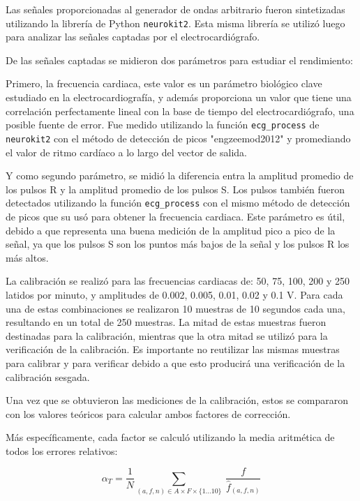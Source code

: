\documentclass[conference]{IEEEtran}
\begin{document}
Las señales proporcionadas al generador de ondas arbitrario fueron sintetizadas 
utilizando la librería de Python \texttt{neurokit2}. \cite{neurokit2}
Esta misma librería se utilizó
luego para analizar las señales captadas por el electrocardiógrafo.

De las señales captadas se midieron dos parámetros para estudiar el rendimiento:

Primero, la frecuencia cardiaca, este valor es un parámetro biológico clave estudiado
en la electrocardiografía, y además proporciona un valor que tiene una correlación
perfectamente lineal con la base de tiempo del electrocardiógrafo, una posible fuente
de error. Fue medido utilizando la función \texttt{ecg\_process} de \texttt{neurokit2}
con  el método de detección de picos "engzeemod2012" y promediando el valor de ritmo
cardíaco a lo largo del vector de salida.

Y como segundo parámetro, se midió la diferencia entra la amplitud promedio de los
pulsos R y la amplitud promedio de los pulsos S. Los pulsos también fueron detectados
utilizando la función \texttt{ecg\_process} con el mismo método de detección de picos
que su usó para obtener la frecuencia cardiaca. Este parámetro es útil, debido a que
representa una buena medición de la amplitud pico a pico de la señal, ya que los
pulsos S son los puntos más bajos de la señal y los pulsos R los más altos.

La calibración se realizó para las frecuencias cardiacas de: 50, 75, 100, 200 y 250
latidos por minuto, y amplitudes de 0.002, 0.005, 0.01, 0.02 y 0.1 V.
Para cada una de estas combinaciones se realizaron 10 muestras de 10 segundos cada
una, resultando en un total de 250 muestras. La mitad de estas muestras fueron
destinadas para la calibración, mientras que la otra  mitad se utilizó para la
verificación de la calibración. Es importante no reutilizar las mismas muestras para
calibrar y para verificar debido a que esto producirá una verificación de la
calibración sesgada.

Una vez que se obtuvieron las mediciones de la calibración, estos se compararon con 
los valores teóricos para calcular ambos factores de corrección.

Más específicamente, cada factor se calculó utilizando la media aritmética
de todos los errores relativos:

$$\alpha_{T} = \dfrac{1}{N} \sum_{(a,f,n) \in A \times F \times \{1...10 \}}\nolimits
~ \frac{f}{\hat{f}_{(a,f,n)}} $$ 
 
\end{document}
